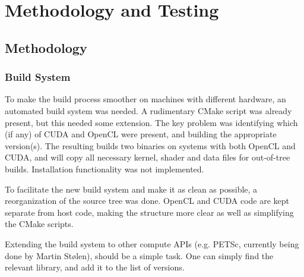 \chapter{Methodology and Testing}
\section{Methodology}
\subsection{Build System}
To make the build process smoother on machines with different hardware, an automated build system was needed. A rudimentary CMake script was already present, but this needed some extension. The key problem was identifying which (if any) of CUDA and OpenCL were present, and building the appropriate version(s). The resulting builds two binaries on systems with both OpenCL and CUDA, and will copy all necessary kernel, shader and data files for out-of-tree builds. Installation functionality was not implemented.

To facilitate the new build system and make it as clean as possible, a reorganization of the source tree was done. OpenCL and CUDA code are kept separate from host code, making the structure more clear as well as simplifying the CMake scripts.

Extending the build system to other compute APIs (e.g. PETSc, currently being done by Martin Stølen), should be a simple task. One can simply find the relevant library, and add it to the list of versions.


